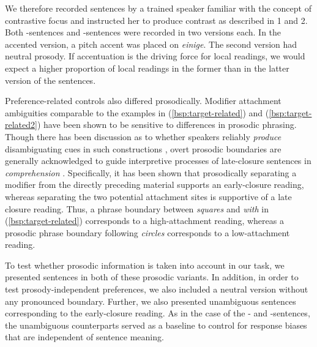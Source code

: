 \documentclass[fleqn,reqno,10pt,draft]{article}
\newcommand{\as}{\acro{as}}
\renewcommand{\es}{\acro{es}}
\begin{document}
\noindent We therefore recorded sentences by a trained speaker
familiar with the concept of contrastive focus and instructed her to
produce contrast as described in 1 and 2. Both \as-sentences and
\es-sentences were recorded in two versions each. In the accented
version, a pitch accent was placed on {\it einige}. The second version
had neutral prosody.  If accentuation is the driving force for local
readings, we would expect a higher proportion of local readings in the
former than in the latter version of the sentences.

Preference-related controls also differed prosodically. Modifier
attachment ambiguities comparable to the examples in
(\ref{bsp:target-related}) and (\ref{bsp:target-related2}) have been
shown to be sensitive to differences in prosodic phrasing. Though
there has been discussion as to whether speakers reliably
\textit{produce} disambiguating cues in such constructions
\citep[e.g.][]{Allbritton96,Kraljik05, Snedeker03, Schafer00}, overt
prosodic boundaries are generally acknowledged to guide interpretive
processes of late-closure sentences in \textit{comprehension}
\citep[e.g.][]{Steinhauer99, Augurzky06}.  Specifically, it has been
shown that prosodically separating a modifier from the directly
preceding material supports an early-closure reading, whereas
separating the two potential attachment sites is supportive of a late
closure reading. Thus, a phrase boundary between {\it squares} and
{\it with} in (\ref{bsp:target-related}) corresponds to a
high-attachment reading, whereas a prosodic phrase boundary following
{\it circles} corresponds to a low-attachment reading.

To test whether prosodic information is taken into account in our
task, we presented sentences in both of these prosodic variants. In
addition, in order to test prosody-independent preferences, we also
included a neutral version without any pronounced boundary. Further,
we also presented unambiguous sentences corresponding to the
early-closure reading. As in the case of the \as- and \es-sentences,
the unambiguous counterparts served as a baseline to control for
response biases that are independent of sentence meaning.
\end{document}
